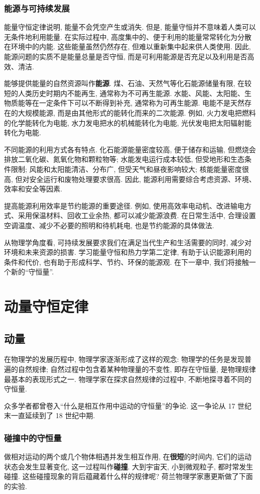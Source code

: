 \documentclass[UTF8,openany,fontset=fandol]{ctexbook}
\theoremstyle{chinesetextbook}
\begin{document}
\subsection{能源与可持续发展}
能量守恒定律说明, 能量不会凭空产生或消失. 但是, 能量守恒并不意味着人类可以无条件地利用能量. 在实际过程中, 高度集中的、便于利用的能量常常转化为分散在环境中的内能. 这些能量虽然仍然存在, 但难以重新集中起来供人类使用. 因此, 能源问题的实质不是能量总量是否守恒, 而是可利用能源是否充足以及利用是否高效、清洁.

能够提供能量的自然资源叫作\textbf{能源}. 煤、石油、天然气等化石能源储量有限, 在较短的人类历史时期内不能再生, 通常称为不可再生能源. 水能、风能、太阳能、生物质能等在一定条件下可以不断得到补充, 通常称为可再生能源. 电能不是天然存在的大规模能源, 而是由其他形式的能转化而来的二次能源. 例如, 火力发电把燃料的化学能转化为电能, 水力发电把水的机械能转化为电能, 光伏发电把太阳辐射能转化为电能.

不同能源的利用方式各有特点. 化石能源能量密度较高, 便于储存和运输, 但燃烧会排放二氧化碳、氮氧化物和颗粒物等; 水能发电运行成本较低, 但受地形和生态条件限制; 风能和太阳能清洁、分布广, 但受天气和昼夜影响较大; 核能能量密度很高, 但对安全运行和废物处理要求很高. 因此, 能源利用需要综合考虑资源、环境、效率和安全等因素.

提高能源利用效率是节约能源的重要途径. 例如, 使用高效率电动机、改进输电方式、采用保温材料、回收工业余热, 都可以减少能源浪费. 在日常生活中, 合理设置空调温度、减少不必要的照明和待机耗电, 也是节约能源的具体做法.

从物理学角度看, 可持续发展要求我们在满足当代生产和生活需要的同时, 减少对环境和未来资源的损害. 学习能量守恒和热力学第二定律, 有助于认识能源利用的条件和代价, 也有助于形成科学、节约、环保的能源观. 在下一章中, 我们将接触一个新的“守恒量”.
\chapter{动量守恒定律}
\section{动量}\label{sec:第一节动量}
在物理学的发展历程中, 物理学家逐渐形成了这样的观念: 物理学的任务是发现普遍的自然规律; 自然过程中包含着某种物理量的不变性, 即存在守恒量, 是物理规律最基本的表现形式之一. 物理学家在探求自然规律的过程中, 不断地探寻着不同的守恒量.

众多学者都曾卷入“什么是相互作用中运动的守恒量”的争论. 这一争论从 17 世纪末一直延续到了 18 世纪中期.
\subsection*{碰撞中的守恒量}
做相对运动的两个或几个物体相遇并发生相互作用, 在\textbf{很短}的时间内, 它们的运动状态会发生显著变化, 这一过程叫作\textbf{碰撞}. 大到宇宙天, 小到微观粒子, 都时常发生碰撞. 这些碰撞现象的背后蕴藏着什么样的规律呢? 荷兰物理学家惠更斯做了下面的实验.
\end{document}
